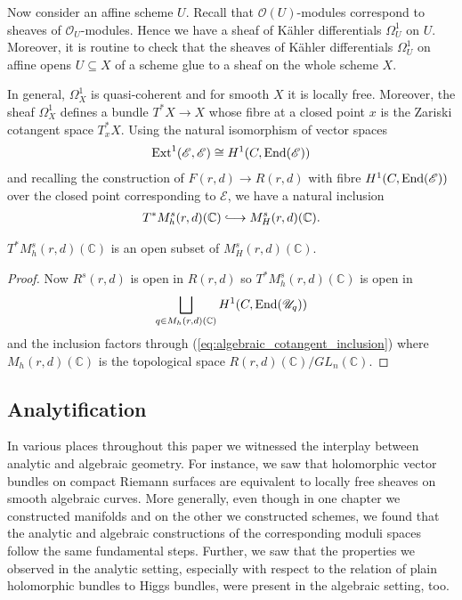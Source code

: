 \documentclass[12pt]{ociamthesis}  %
\begin{document}
Now consider an affine scheme $U$. Recall that $\mathscr O(U)$-modules
correspond to sheaves of $\mathscr O_U$-modules. Hence we have a sheaf of K\"ahler
differentials $\Omega^1_U$ on $U$. Moreover, it is routine to check that the
sheaves of K\"ahler differentials $\Omega^1_U$ on affine opens
$U\subseteq X$ of a scheme glue to a sheaf on the whole scheme $X$.

In general, $\Omega^1_X$ is quasi-coherent and for smooth $X$ it is
locally free. \cite[\href{https://stacks.math.columbia.edu/tag/02G1}{Tag 02G1}]{stacks-project}
Moreover, the sheaf $\Omega^1_X$ defines a bundle $T^*X\to X$
whose fibre at a closed point $x$ is the Zariski cotangent space
$T^*_x X$. \cite[\href{https://stacks.math.columbia.edu/tag/0B2D}{Tag 0B2D}]{stacks-project}
Using the natural isomorphism of vector spaces
\begin{align*}
  \operatorname{Ext}^1(\mathscr E,\mathscr E) \cong H^1(C,\operatorname{End}(\mathscr E))
\end{align*}
and recalling the construction of $F(r,d)\to R(r,d)$ with
fibre $H^1(C,\operatorname{End}(\mathscr E))$ over the closed point corresponding
to $\mathscr E$, we have a natural inclusion
\begin{align}\label{eq:algebraic_cotangent_inclusion}
  T^*M^s_h(r,d)(\mathbb C) \longinc M^s_H(r,d)(\mathbb C).
\end{align}

\begin{corollary}\label{thm:cotangent_is_open}
  $T^*M^s_h(r,d)(\mathbb C)$ is an open subset of $M^s_H(r,d)(\mathbb C)$.
  \begin{proof}
    Now $R^s(r,d)$ is open in $R(r,d)$ so
    $T^*M^s_h(r,d)(\mathbb C)$ is open in
    \begin{align*}
      \bigsqcup_{q\in M_h(r,d)(\mathbb C)} H^1(C,\operatorname{End}(\mathscr U_q))
    \end{align*}
    and the inclusion factors through (\ref{eq:algebraic_cotangent_inclusion})
    where $M_h(r,d)(\mathbb C)$ is the topological space
    $R(r,d)(\mathbb C)/GL_n(\mathbb C)$.
  \end{proof}
\end{corollary}


\subsection{Analytification}

In various places throughout this paper we witnessed the interplay
between analytic and algebraic geometry. For instance, we saw that
holomorphic vector bundles on compact Riemann surfaces are equivalent
to locally free sheaves on smooth algebraic curves. More generally,
even though in one chapter we constructed manifolds and on the other
we constructed schemes, we found that the analytic and algebraic
constructions of the corresponding moduli spaces follow the same
fundamental steps. Further, we saw that the properties we observed
in the analytic setting, especially with respect to the relation
of plain holomorphic bundles to Higgs bundles, were present in the
algebraic setting, too.
\end{document}
